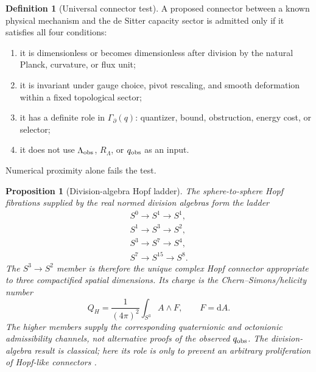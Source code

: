 \documentclass[aps,prd,reprint,nofootinbib,superscriptaddress,floatfix]{revtex4-2}
\numberwithin{equation}{section}
\theoremstyle{definition}
\newtheorem{definition}{Definition}[section]
\theoremstyle{plain}
\newtheorem{proposition}{Proposition}[section]
\newcommand{\dd}{\mathrm d}
\begin{document}
\begin{definition}[Universal connector test]
A proposed connector between a known physical mechanism and the de Sitter
capacity sector is admitted only if it satisfies all four conditions:
\begin{enumerate}
\item it is dimensionless or becomes dimensionless after division by
the natural Planck, curvature, or flux unit;
\item it is invariant under gauge choice, pivot rescaling, and smooth
deformation within a fixed topological sector;
\item it has a definite role in \(\Gamma_\partial(q)\): quantizer, bound,
obstruction, energy cost, or selector;
\item it does not use \(\Lambda_{\rm obs}\), \(R_\Lambda\), or \(q_{\rm obs}\)
as an input.
\end{enumerate}
Numerical proximity alone fails the test.
\end{definition}

\begin{proposition}[Division-algebra Hopf ladder]\label{prop:hopf-ladder}
The sphere-to-sphere Hopf fibrations supplied by the real normed division
algebras form the ladder
\begin{gather}
S^0\to S^1\to S^1,\\
S^1\to S^3\to S^2,\\
S^3\to S^7\to S^4,\\
S^7\to S^{15}\to S^8 .
\end{gather}
The \(S^3\to S^2\) member is therefore the unique complex Hopf connector
appropriate to three compactified spatial dimensions.  Its charge is the
Chern--Simons/helicity number
\begin{equation}
Q_H=\frac1{(4\pi)^2}\int_{S^3}A\wedge F,\qquad F=\dd A .
\end{equation}
The higher members supply the corresponding quaternionic and octonionic
admissibility channels, not alternative proofs of the observed
\(q_{\rm obs}\).  The division-algebra result is classical; here its role is
only to prevent an arbitrary proliferation of Hopf-like connectors
\cite{DivisionHopfKTheory,GluckWarnerZiller1986}.
\end{proposition}
\end{document}
